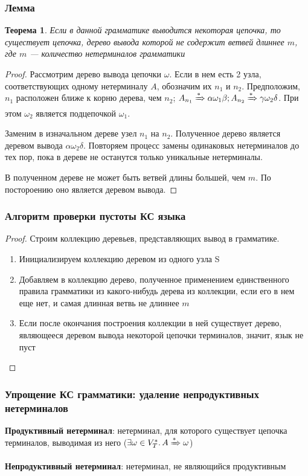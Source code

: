 \documentclass{beamer}
\newtheorem{rutheorem}{Теорема}
\begin{document}
\begin{frame}[fragile]
  \transwipe[direction=90]
  \frametitle{Лемма}
   \begin{rutheorem}
   Если в данной грамматике выводится некоторая цепочка, то существует цепочка, дерево вывода которой не содержит ветвей длиннее $m$, где $m$ --- количество нетерминалов грамматики
   \end{rutheorem}
   \begin{proof}
   Рассмотрим дерево вывода цепочки $\omega$. Если в нем есть 2 узла, соответствующих одному нетерминалу $A$, обозначим их $n_1$ и $n_2$. Предположим, $n_1$ расположен ближе к корню дерева, чем $n_2$; $A_{n_1} \xRightarrow[]{*} \alpha \omega_1 \beta; A_{n_2} \xRightarrow[]{*} \gamma \omega_2 \delta$. При этом $\omega_2$ является подцепочкой $\omega_1$. 
   
   Заменим в изначальном дереве узел $n_1$ на $n_2$. Полученное дерево является деревом вывода $\alpha \omega_2 \delta$. Повторяем процесс замены одинаковых нетерминалов до тех пор, пока в дереве не останутся только уникальные нетерминалы. 
   
   В полученном дереве не может быть ветвей длины большей, чем $m$. По постороению оно является деревом вывода. 
   \end{proof}
\end{frame}

\begin{frame}[fragile]
  \transwipe[direction=90]
  \frametitle{Алгоритм проверки пустоты КС языка}
   \begin{proof}
   Строим коллекцию деревьев, представляющих вывод в грамматике.
   
  \begin{enumerate}
    \item Инициализируем коллекцию деревом из одного узла S
    \item Добавляем в коллекцию дерево, полученное применением единственного правила грамматики из какого-нибудь дерева из коллекции, если его в нем еще нет, и самая длинная ветвь не длиннее $m$
    \item Если после окончания построения коллекции в ней существует дерево, являющееся деревом вывода некоторой цепочки терминалов, значит, язык не пуст
  \end{enumerate}
   \end{proof}
\end{frame}

\begin{frame}[fragile]
  \transwipe[direction=90]
  \frametitle{Упрощение КС грамматики: удаление непродуктивных нетерминалов}
  \textbf{Продуктивный нетерминал}:  нетерминал, для которого существует цепочка терминалов, выводимая из него ($\exists \omega \in V_T^*. \, A \xRightarrow[]{*} \omega$)

  \textbf{Непродуктивный нетерминал}:  нетерминал, не являющийся продуктивным
\end{frame}
\end{document}
